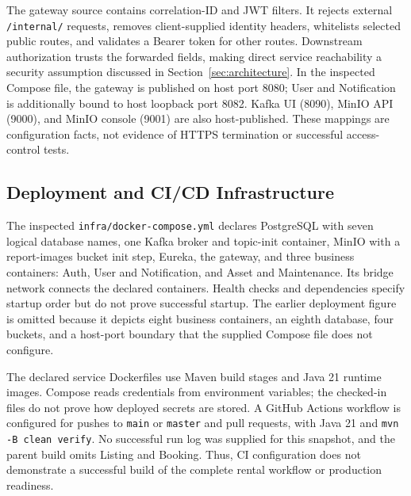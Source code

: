 The gateway source contains correlation-ID and JWT filters. It rejects external \texttt{/internal/} requests, removes client-supplied identity headers, whitelists selected public routes, and validates a Bearer token for other routes. Downstream authorization trusts the forwarded fields, making direct service reachability a security assumption discussed in Section~\ref{sec:architecture}. In the inspected Compose file, the gateway is published on host port 8080; User and Notification is additionally bound to host loopback port 8082. Kafka UI (8090), MinIO API (9000), and MinIO console (9001) are also host-published. These mappings are configuration facts, not evidence of HTTPS termination or successful access-control tests.

\subsection{Deployment and CI/CD Infrastructure}
The inspected \texttt{infra/docker-compose.yml} declares PostgreSQL with seven logical database names, one Kafka broker and topic-init container, MinIO with a report-images bucket init step, Eureka, the gateway, and three business containers: Auth, User and Notification, and Asset and Maintenance. Its bridge network connects the declared containers. Health checks and dependencies specify startup order but do not prove successful startup. The earlier deployment figure is omitted because it depicts eight business containers, an eighth database, four buckets, and a host-port boundary that the supplied Compose file does not configure.

The declared service Dockerfiles use Maven build stages and Java 21 runtime images. Compose reads credentials from environment variables; the checked-in files do not prove how deployed secrets are stored. A GitHub Actions workflow is configured for pushes to \texttt{main} or \texttt{master} and pull requests, with Java 21 and \texttt{mvn -B clean verify}. No successful run log was supplied for this snapshot, and the parent build omits Listing and Booking. Thus, CI configuration does not demonstrate a successful build of the complete rental workflow or production readiness.


